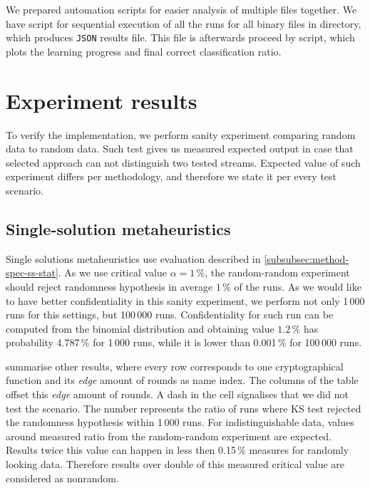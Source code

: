 \documentclass[
  print, %
  Table,   %
  nolof,     %
  nolot,     %
  11pt, %
  oneside  %
]{fithesis3}
\begin{document}
We prepared automation scripts for easier analysis of multiple files together. We have script for sequential execution of all the runs for all binary files in directory, which produces \texttt{JSON} results file. This file is afterwards proceed by script, which plots the learning progress and final correct classification ratio.


\chapter{Experiment results}
\label{chap:res}

To verify the implementation, we perform sanity experiment comparing random data to random data. Such test gives us measured expected output in case that selected approach can not distinguish two tested streams. Expected value of such experiment differs per methodology, and therefore we state it per every test scenario.

\section{Single-solution metaheuristics}
\label{sec:res-ss}


Single solutions metaheuristics use evaluation described in \cref{subsubsec:method-spec-ss-stat}. As we use critical value $\alpha=1\,\%$, the random-random experiment should reject randomness hypothesis in average $1\,\%$ of the runs. As we would like to have better confidentiality in this sanity experiment, we perform not only 1\,000 runs for this settings, but 100\,000 runs. Confidentiality for such run can be computed from the binomial distribution and obtaining value $1.2\,\%$ has probability 4.787\,\% for 1\,000 runs, while it is lower than 0.001\,\% for 100\,000 runs.

 summarise other results, where every row corresponds to one cryptographical function and its \textit{edge} amount of rounds as name index. The columns of the table offset this \textit{edge} amount of rounds. A dash in the cell signalises that we did not test the scenario. The number represents the ratio of runs where KS test rejected the randomness hypothesis within 1\,000 runs. For indistinguishable data, values around measured ratio from the random-random experiment are expected. Results twice this value can happen in less then 0.15\,\% measures for randomly looking data. Therefore results over double of this measured critical value are considered as nonrandom.
\end{document}
